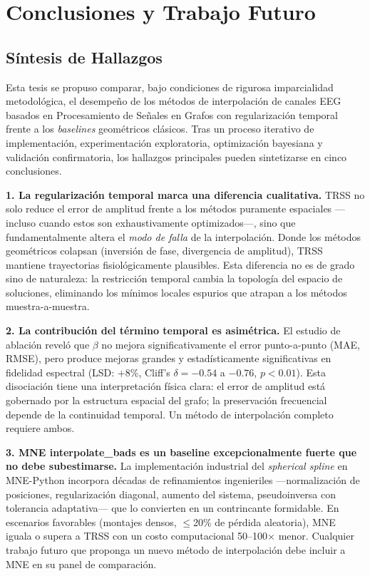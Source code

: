 \chapter{Conclusiones y Trabajo Futuro}

\section{Síntesis de Hallazgos}

Esta tesis se propuso comparar, bajo condiciones de rigurosa imparcialidad metodológica, el desempeño de los métodos de interpolación de canales EEG basados en Procesamiento de Señales en Grafos con regularización temporal frente a los \textit{baselines} geométricos clásicos. Tras un proceso iterativo de implementación, experimentación exploratoria, optimización bayesiana y validación confirmatoria, los hallazgos principales pueden sintetizarse en cinco conclusiones.

\textbf{1. La regularización temporal marca una diferencia cualitativa.} TRSS no solo reduce el error de amplitud frente a los métodos puramente espaciales —incluso cuando estos son exhaustivamente optimizados—, sino que fundamentalmente altera el \textit{modo de falla} de la interpolación. Donde los métodos geométricos colapsan (inversión de fase, divergencia de amplitud), TRSS mantiene trayectorias fisiológicamente plausibles. Esta diferencia no es de grado sino de naturaleza: la restricción temporal cambia la topología del espacio de soluciones, eliminando los mínimos locales espurios que atrapan a los métodos muestra-a-muestra.

\textbf{2. La contribución del término temporal es asimétrica.} El estudio de ablación reveló que $\beta$ no mejora significativamente el error punto-a-punto (MAE, RMSE), pero produce mejoras grandes y estadísticamente significativas en fidelidad espectral (LSD: $+8\%$, Cliff's $\delta = -0.54$ a $-0.76$, $p < 0.01$). Esta disociación tiene una interpretación física clara: el error de amplitud está gobernado por la estructura espacial del grafo; la preservación frecuencial depende de la continuidad temporal. Un método de interpolación completo requiere ambos.

\textbf{3. MNE interpolate\_bads es un baseline excepcionalmente fuerte que no debe subestimarse.} La implementación industrial del \textit{spherical spline} en MNE-Python incorpora décadas de refinamientos ingenieriles —normalización de posiciones, regularización diagonal, aumento del sistema, pseudoinversa con tolerancia adaptativa— que lo convierten en un contrincante formidable. En escenarios favorables (montajes densos, $\leq$20\% de pérdida aleatoria), MNE iguala o supera a TRSS con un costo computacional 50--100$\times$ menor. Cualquier trabajo futuro que proponga un nuevo método de interpolación debe incluir a MNE en su panel de comparación.

